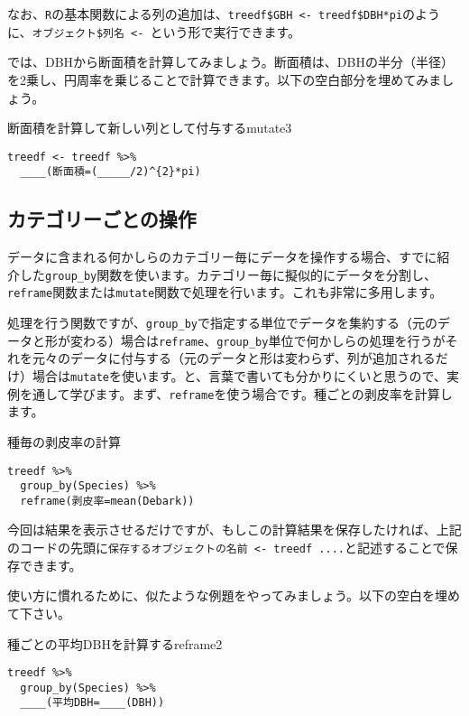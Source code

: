 なお、\texttt{R}の基本関数による列の追加は、\verb|treedf$GBH <- treedf$DBH*pi|のように、\verb|オブジェクト$列名 <- |という形で実行できます。

では、DBHから断面積を計算してみましょう。断面積は、DBHの半分（半径）を2乗し、円周率を乗じることで計算できます。以下の空白部分を埋めてみましょう。
\begin{exercise}{断面積を計算して新しい列として付与する}{mutate3}
\begin{verbatim}
treedf <- treedf %>%
  ____(断面積=(_____/2)^{2}*pi)
\end{verbatim}
\end{exercise}

  \subsection{カテゴリーごとの操作}
データに含まれる何かしらのカテゴリー毎にデータを操作する場合、すでに紹介した\verb|group_by|関数を使います。カテゴリー毎に擬似的にデータを分割し、\verb|reframe|関数または\verb|mutate|関数で処理を行います。これも非常に多用します。

処理を行う関数ですが、\verb|group_by|で指定する単位でデータを集約する（元のデータと形が変わる）場合は\verb|reframe|、\verb|group_by|単位で何かしらの処理を行うがそれを元々のデータに付与する（元のデータと形は変わらず、列が追加されるだけ）場合は\verb|mutate|を使います。と、言葉で書いても分かりにくいと思うので、実例を通して学びます。まず、\verb|reframe|を使う場合です。種ごとの剥皮率を計算します。
\begin{itembox}[l]{種毎の剥皮率の計算}
\begin{verbatim}
treedf %>%
  group_by(Species) %>%
  reframe(剥皮率=mean(Debark))
\end{verbatim}
\end{itembox}

今回は結果を表示させるだけですが、もしこの計算結果を保存したければ、上記のコードの先頭に\verb|保存するオブジェクトの名前 <- treedf ....|と記述することで保存できます。

使い方に慣れるために、似たような例題をやってみましょう。以下の空白を埋めて下さい。
\begin{exercise}{種ごとの平均DBHを計算する}{reframe2}
\begin{verbatim}
treedf %>%
  group_by(Species) %>%
  ____(平均DBH=____(DBH))
\end{verbatim}
\end{exercise}

